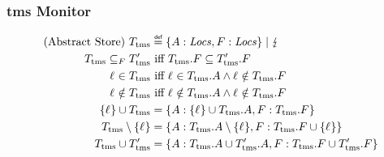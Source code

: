 \subsubsection{\gls*{tms} Monitor}\label{subsubsec-mon-tms}

\begin{definition}{}
  \begin{gather*}
    \begin{aligned}
      \text{(Abstract Store)}~\tmsMonitor &\isdef\{A : \mi{Locs}, F : \mi{Locs}\} \mid \lightning \\
      \tmsMonitor\subseteq_F \tmsMonitor['] &\text{ iff } \tmsMonitor[.F] \subseteq \tmsMonitor['.F]\\
      \varLoc\in \tmsMonitor &\text{ iff } \varLoc \in {\tmsMonitor[.A]} \wedge \varLoc \notin {\tmsMonitor[.F]}\\
      \varLoc\notin \tmsMonitor &\text{ iff } \varLoc \notin {\tmsMonitor[.A]} \wedge \varLoc \notin {\tmsMonitor[.F]}\\
      \{\varLoc\}\cup \tmsMonitor &= \{A : \{\varLoc\}\cup \tmsMonitor[.A], F : \tmsMonitor[.F]\}\\
      \tmsMonitor\setminus\{\varLoc\} &= \{A : \tmsMonitor[.A]\setminus\{\varLoc\}, F : \tmsMonitor[.F]\cup\left\{\varLoc\right\}\}\\
      \tmsMonitor\cup \tmsMonitor' &= \{A : \tmsMonitor[.A]\cup \tmsMonitor['.A], F : \tmsMonitor[.F]\cup \tmsMonitor['.F]\}\\
    \end{aligned}
  \end{gather*}
\end{definition}

